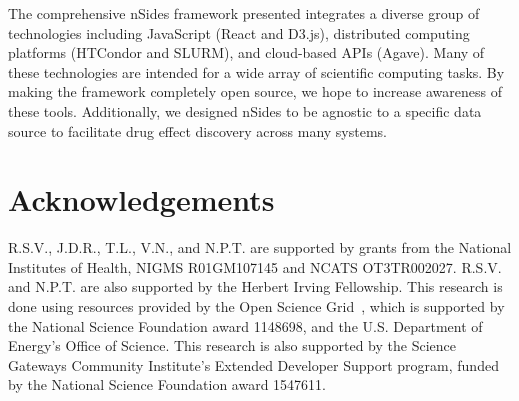 \documentclass{ws-procs11x85}
\begin{document}
The comprehensive nSides framework presented integrates a diverse
group of technologies including JavaScript (React and D3.js),
distributed computing platforms (HTCondor and SLURM), and cloud-based
APIs (Agave). Many of these technologies are intended for a wide array
of scientific computing tasks.  By making the framework completely
open source, we hope to increase awareness of these tools.
Additionally, we designed nSides to be agnostic to a specific data
source to facilitate drug effect discovery across many systems.

\section{Acknowledgements}
R.S.V., J.D.R., T.L., V.N., and N.P.T. are supported by grants from
the National Institutes of Health, NIGMS R01GM107145 and NCATS
OT3TR002027. R.S.V. and N.P.T. are also supported by the Herbert
Irving Fellowship. This research is done using resources provided by
the Open Science Grid~\cite{pordes2007open, sfiligoi2009pilot}, which
is supported by the National Science Foundation award 1148698, and the
U.S. Department of Energy's Office of Science.  This research is also
supported by the Science Gateways Community Institute's Extended
Developer Support program, funded by the National Science Foundation
award 1547611.







\end{document}
